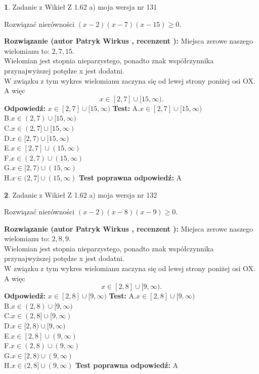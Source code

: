 \documentclass[12pt, a4paper]{article}
\theoremstyle{definition} %
\newtheorem{zad}{}
\newcommand{\zadStart}[1]{\begin{zad}#1\newline}
\newcommand{\zadStop}{\end{zad}}
\newcommand{\rozwStart}[2]{\noindent \textbf{Rozwiązanie (autor #1 , recenzent #2): }\newline}
\newcommand{\rozwStop}{\newline}
\newcommand{\odpStart}{\noindent \textbf{Odpowiedź:}\newline}
\newcommand{\odpStop}{\newline}
\newcommand{\testStart}{\noindent \textbf{Test:}\newline}
\newcommand{\testStop}{\newline}
\newcommand{\kluczStart}{\noindent \textbf{Test poprawna odpowiedź:}\newline}
\newcommand{\kluczStop}{\newline}
\begin{document}
\zadStart{Zadanie z Wikieł Z 1.62 a) moja wersja nr 131}

Rozwiązać nierówności $(x-2)(x-7)(x-15)\ge0$.
\zadStop
\rozwStart{Patryk Wirkus}{}
Miejsca zerowe naszego wielomianu to: $2, 7, 15$.\\
Wielomian jest stopnia nieparzystego, ponadto znak współczynnika przy\linebreak najwyższej potędze x jest dodatni.\\ W związku z tym wykres wielomianu zaczyna się od lewej strony poniżej osi OX. A więc $$x \in [2,7] \cup [15,\infty).$$
\rozwStop
\odpStart
$x \in [2,7] \cup [15,\infty)$
\odpStop
\testStart
A.$x \in [2,7] \cup [15,\infty)$\\
B.$x \in (2,7) \cup [15,\infty)$\\
C.$x \in (2,7] \cup [15,\infty)$\\
D.$x \in [2,7) \cup [15,\infty)$\\
E.$x \in [2,7] \cup (15,\infty)$\\
F.$x \in (2,7) \cup (15,\infty)$\\
G.$x \in [2,7) \cup (15,\infty)$\\
H.$x \in (2,7] \cup (15,\infty)$
\testStop
\kluczStart
A
\kluczStop



\zadStart{Zadanie z Wikieł Z 1.62 a) moja wersja nr 132}

Rozwiązać nierówności $(x-2)(x-8)(x-9)\ge0$.
\zadStop
\rozwStart{Patryk Wirkus}{}
Miejsca zerowe naszego wielomianu to: $2, 8, 9$.\\
Wielomian jest stopnia nieparzystego, ponadto znak współczynnika przy\linebreak najwyższej potędze x jest dodatni.\\ W związku z tym wykres wielomianu zaczyna się od lewej strony poniżej osi OX. A więc $$x \in [2,8] \cup [9,\infty).$$
\rozwStop
\odpStart
$x \in [2,8] \cup [9,\infty)$
\odpStop
\testStart
A.$x \in [2,8] \cup [9,\infty)$\\
B.$x \in (2,8) \cup [9,\infty)$\\
C.$x \in (2,8] \cup [9,\infty)$\\
D.$x \in [2,8) \cup [9,\infty)$\\
E.$x \in [2,8] \cup (9,\infty)$\\
F.$x \in (2,8) \cup (9,\infty)$\\
G.$x \in [2,8) \cup (9,\infty)$\\
H.$x \in (2,8] \cup (9,\infty)$
\testStop
\kluczStart
A
\kluczStop
\end{document}
